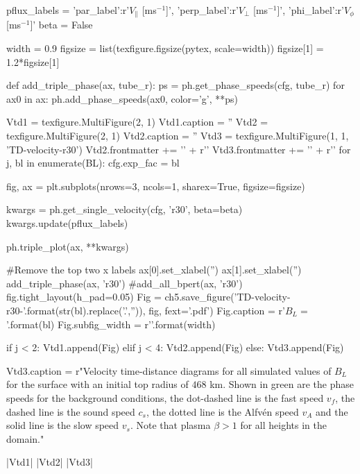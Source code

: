 \begin{pycode}[chapter5]
pflux_labels = {'par_label':r'$V_\parallel$ [ms$^{-1}$]',
                'perp_label':r'$V_\perp$ [ms$^{-1}$]',
                'phi_label':r'$V_\phi$ [ms$^{-1}$]'}
beta = False

width = 0.9
figsize = list(texfigure.figsize(pytex, scale=width))
figsize[1] = 1.2*figsize[1]

def add_triple_phase(ax, tube_r):
    ps = ph.get_phase_speeds(cfg, tube_r)
    for ax0 in ax:
        ph.add_phase_speeds(ax0, color='g', **ps)

Vtd1 = texfigure.MultiFigure(2, 1)
Vtd1.caption = ''
Vtd2 = texfigure.MultiFigure(2, 1)
Vtd2.caption = ''
Vtd3 = texfigure.MultiFigure(1, 1, 'TD-velocity-r30')
Vtd2.frontmatter += '\n' + r'\ContinuedFloat'
Vtd3.frontmatter += '\n' + r'\ContinuedFloat'
for j, bl in enumerate(BL):
    cfg.exp_fac = bl

    fig, ax = plt.subplots(nrows=3, ncols=1, sharex=True, figsize=figsize)

    kwargs = ph.get_single_velocity(cfg, 'r30', beta=beta)
    kwargs.update(pflux_labels)

    ph.triple_plot(ax, **kwargs)

    #Remove the top two x labels
    ax[0].set_xlabel('')
    ax[1].set_xlabel('')
    add_triple_phase(ax, 'r30')
    #add_all_bpert(ax, 'r30')
    fig.tight_layout(h_pad=0.05)
    Fig = ch5.save_figure('TD-velocity-r30-{}'.format(str(bl).replace('.','')), fig, fext='.pdf')
    Fig.caption = r'$B_L = {}$'.format(bl)
    Fig.subfig_width = r'{}\columnwidth'.format(width)

    if j < 2:
        Vtd1.append(Fig)
    elif j < 4:
        Vtd2.append(Fig)
    else:
        Vtd3.append(Fig)

Vtd3.caption = r"Velocity time-distance diagrams for all simulated values of $B_L$ for the surface with an initial top radius of $468$ km. Shown in green are the phase speeds for the background conditions, the dot-dashed line is the fast speed $v_f$, the dashed line is the sound speed $c_s$, the dotted line is the Alfv\'en speed $v_A$ and the solid line is the slow speed $v_s$. Note that plasma $\beta > 1$ for all heights in the domain."

\end{pycode}

\py[chapter5]|Vtd1|
\py[chapter5]|Vtd2|
\py[chapter5]|Vtd3|


